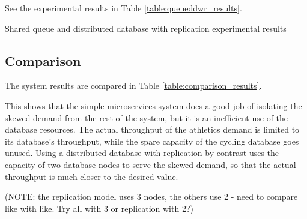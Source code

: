 See the experimental results in Table \ref{table:queueddwr_results}.

\begin{table}[h!]
	\begin{center}
		\caption{Shared queue and distributed database with replication experimental results}
		\label{table:queueddwr_results}
	\end{center}
\end{table}

%
%
\subsection{Comparison}

The system results are compared in Table \ref{table:comparison_results}.

This shows that the simple microservices system does a good job of isolating the skewed demand from the rest of the system, but it is an inefficient use of the database resources.  The actual throughput of the athletics demand is limited to its database's throughput, while the spare capacity of the cycling database goes unused.  Using a distributed database with replication by contrast uses the capacity of two database nodes to serve the skewed demand, so that the actual throughput is much closer to the desired value.

(NOTE: the replication model uses 3 nodes, the others use 2 - need to compare like with like.  Try all with 3 or replication with 2?)

